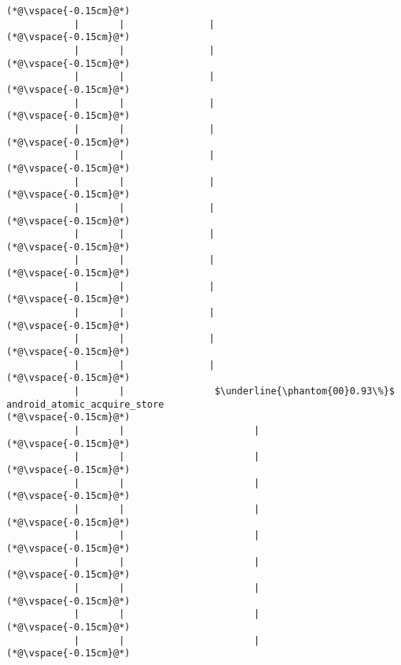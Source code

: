 \begin{lstlisting}[caption=Staattinen metodi Java$\to$C , label=profile:J2CBenchmark00001, numberbychapter=true, frame=lines, float, floatplacement=t]
(*@\vspace{-0.15cm}@*)
            |       |               |
(*@\vspace{-0.15cm}@*)
            |       |               |
(*@\vspace{-0.15cm}@*)
            |       |               |
(*@\vspace{-0.15cm}@*)
            |       |               |
(*@\vspace{-0.15cm}@*)
            |       |               |
(*@\vspace{-0.15cm}@*)
            |       |               |
(*@\vspace{-0.15cm}@*)
            |       |               |
(*@\vspace{-0.15cm}@*)
            |       |               |
(*@\vspace{-0.15cm}@*)
            |       |               |
(*@\vspace{-0.15cm}@*)
            |       |               |
(*@\vspace{-0.15cm}@*)
            |       |               |
(*@\vspace{-0.15cm}@*)
            |       |               |
(*@\vspace{-0.15cm}@*)
            |       |               |
(*@\vspace{-0.15cm}@*)
            |       |               |
(*@\vspace{-0.15cm}@*)
            |       |                $\underline{\phantom{00}0.93\%}$ android_atomic_acquire_store
(*@\vspace{-0.15cm}@*)
            |       |                       |
(*@\vspace{-0.15cm}@*)
            |       |                       |
(*@\vspace{-0.15cm}@*)
            |       |                       |
(*@\vspace{-0.15cm}@*)
            |       |                       |
(*@\vspace{-0.15cm}@*)
            |       |                       |
(*@\vspace{-0.15cm}@*)
            |       |                       |
(*@\vspace{-0.15cm}@*)
            |       |                       |
(*@\vspace{-0.15cm}@*)
            |       |                       |
(*@\vspace{-0.15cm}@*)
            |       |                       |
(*@\vspace{-0.15cm}@*)

\end{lstlisting}
